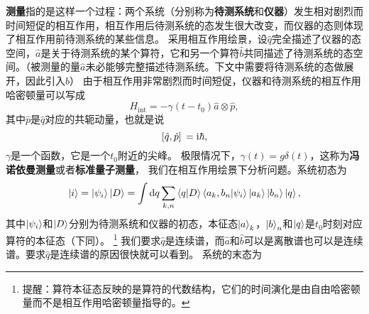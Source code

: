 \documentclass[UTF8, a4paper]{ctexart}
\newcommand*{\ii}{\mathrm{i}}
\begin{document}
\textbf{测量}指的是这样一个过程：两个系统（分别称为\textbf{待测系统}和\textbf{仪器}）发生相对剧烈而时间短促的相互作用，相互作用后待测系统的态发生很大改变，而仪器的态则体现了相互作用前待测系统的某些信息。
采用相互作用绘景，设$\hat{q}$完全描述了仪器的态空间，$\hat{a}$是关于待测系统的某个算符，它和另一个算符$\hat{b}$共同描述了待测系统的态空间。（被测量的量$\hat{a}$未必能够完整描述待测系统。下文中需要将待测系统的态做展开，因此引入$\hat{b}$）
由于相互作用非常剧烈而时间短促，仪器和待测系统的相互作用哈密顿量可以写成
\begin{equation}
    H_\text{int} = - \gamma(t-t_0) \hat{a} \otimes \hat{p},
\end{equation}
其中$\hat{p}$是$\hat{q}$对应的共轭动量，也就是说
\[
    \comm*{\hat{q}}{\hat{p}} = \ii \hbar,
\]
$\gamma$是一个函数，它是一个$t_0$附近的尖峰。
极限情况下，$\gamma(t) = g \delta(t)$，这称为\textbf{冯诺依曼测量}或者\textbf{标准量子测量}，
我们在相互作用绘景下分析问题。系统初态为
\[
    \ket{i} = \ket{\psi_i} \ket{D} = \int \dd{q} \sum_{k, n} \braket{q}{D} \braket{a_k, b_n}{\psi_i} \ket{a_k} \ket{b_n} \ket{q},
\]
其中$\ket{\psi_i}$和$\ket{D}$分别为待测系统和仪器的初态，本征态$\ket{a}_k$，$\ket{b}_n$和$\ket{q}$是$t_0$时刻对应算符的本征态（下同）。%
\footnote{提醒：算符本征态反映的是算符的代数结构，它们的时间演化是由自由哈密顿量而不是相互作用哈密顿量指导的。}%
我们要求$\hat{q}$是连续谱，而$\hat{a}$和$\hat{b}$可以是离散谱也可以是连续谱。要求$\hat{q}$是连续谱的原因很快就可以看到。
系统的末态为
\end{document}
